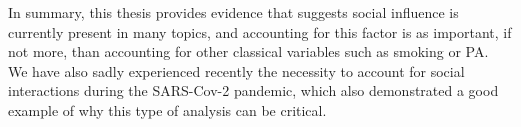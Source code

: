 
In summary, this thesis provides evidence that suggests social influence is currently present in many topics, and accounting for this factor is as important, if not more, than accounting for other classical variables such as smoking or PA. We have also sadly experienced recently the necessity to account for social interactions during the SARS-Cov-2 pandemic, which also demonstrated a good example of why this type of analysis can be critical.




